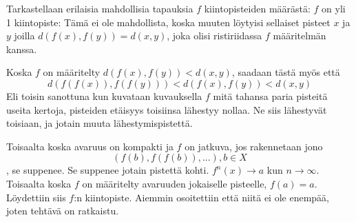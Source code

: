 \documentclass[12pt,a4paper,leqno]{amsart}
\begin{document}
Tarkastellaan erilaisia mahdollisia tapauksia $f$ kiintopisteiden määrästä:
$f$ on yli 1 kiintopiste: Tämä ei ole mahdollista, koska muuten löytyisi sellaiset pisteet $x$ ja $y$ joilla $d(f(x),f(y)) = d(x,y)$, joka olisi ristiriidassa $f$ määritelmän kanssa.

Koska $f$ on määritelty $d(f(x),f(y)) < d(x,y)$, saadaan tästä myös että \[d(f(f(x)),f(f(y))) < d(f(x),f(y)) < d(x,y)\]
Eli toisin sanottuna kun kuvataan kuvauksella $f$ mitä tahansa paria pisteitä useita kertoja, pisteiden etäisyys toisiinsa lähestyy nollaa. Ne siis lähestyvät toisiaan, ja jotain muuta lähestymispistettä.

Toisaalta koska avaruus on kompakti ja $f$ on jatkuva, jos rakennetaan jono \[(f(b), f(f(b)), ...), b \in X\], se suppenee. Se suppenee jotain pistettä kohti. $f^n(x) \to a$ kun $n \to \infty$. Toisaalta koska $f$ on määritelty avaruuden jokaiselle pisteelle, $f(a) = a$. Löydettiin siis $f$:n kiintopiste. Aiemmin osoitettiin että niitä ei ole enempää, joten tehtävä on ratkaistu.


\bigskip
\end{document}
